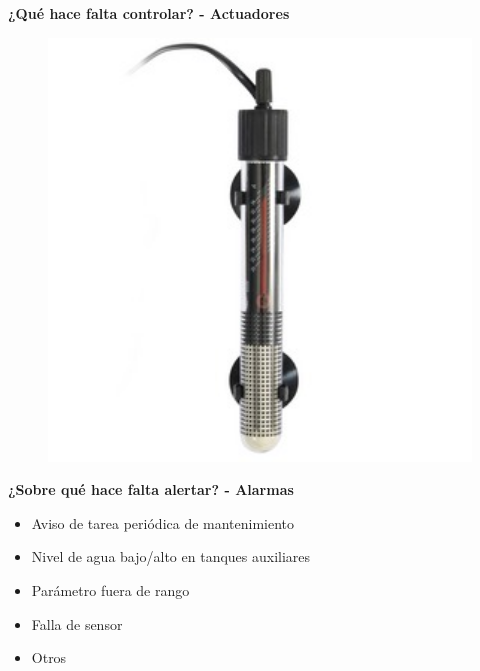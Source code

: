 \documentclass{beamer}
\begin{document}
\begin{frame}{\textbf{¿Qué hace falta controlar? - Actuadores}}
\begin{minipage}[c]{1.0\linewidth}
\begin{minipage}[c]{0.35\linewidth}
\begin{figure}[H]
		{\includegraphics[width=1\textwidth]{./imagenes/actuador_heater}}	
	\end{figure}	  	  	
  \end{minipage}
\end{minipage}
\end{frame}

\begin{frame}{\textbf{¿Sobre qué hace falta alertar? - Alarmas}}
\fontsize{14pt}{15}\selectfont
\begin{itemize}
	\item Aviso de tarea periódica de mantenimiento
	\vspace{10px}
	\item Nivel de agua bajo/alto en tanques auxiliares
	\vspace{10px}
	\item Parámetro fuera de rango
	\vspace{10px}
	\item Falla de sensor
	\vspace{10px}
	\item Otros	
\end{itemize}	
\end{frame}
\end{document}
